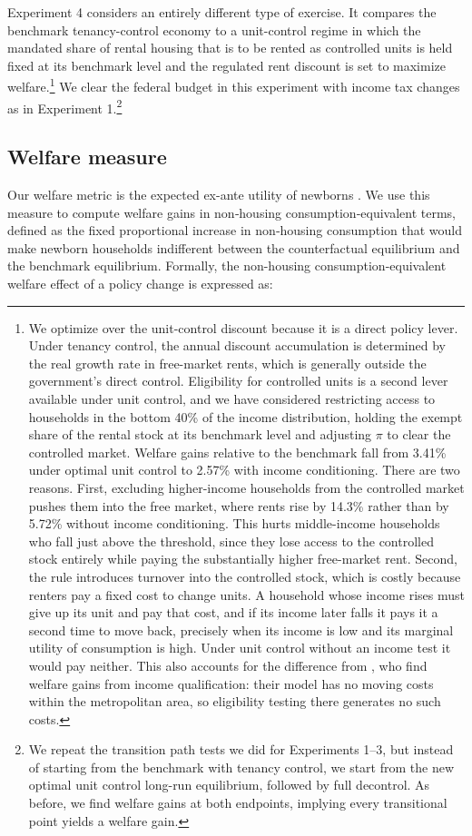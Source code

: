 \documentclass[parskip=full]{article}
\begin{document}
Experiment 4 considers an entirely different type of exercise. It compares the benchmark tenancy-control economy to a unit-control regime in which the mandated share of rental housing that is to be rented as controlled units is held fixed at its benchmark level and the regulated rent discount is set to maximize welfare.\footnote{We optimize over the unit-control discount because it is a direct policy lever. Under tenancy control, the annual discount accumulation is determined by the real growth rate in free-market rents, which is generally outside the government's direct control. Eligibility for controlled units is a second lever available under unit control, and we have considered restricting access to households in the bottom 40\% of the income distribution, holding the exempt share of the rental stock at its benchmark level and adjusting $\pi$ to clear the controlled market. Welfare gains relative to the benchmark fall from 3.41\% under optimal unit control to 2.57\% with income conditioning. There are two reasons. First, excluding higher-income households from the controlled market pushes them into the free market, where rents rise by 14.3\% rather than by 5.72\% without income conditioning. This hurts middle-income households who fall just above the threshold, since they lose access to the controlled stock entirely while paying the substantially higher free-market rent. Second, the rule introduces turnover into the controlled stock, which is costly because renters pay a fixed cost to change units. A household whose income rises must give up its unit and pay that cost, and if its income later falls it pays it a second time to move back, precisely when its income is low and its marginal utility of consumption is high. Under unit control without an income test it would pay neither. This also accounts for the difference from \citet{fmn-2023}, who find welfare gains from income qualification: their model has no moving costs within the metropolitan area, so eligibility testing there generates no such costs.} We clear the federal budget in this experiment with income tax changes as in Experiment 1.\footnote{We repeat the transition path tests we did for Experiments 1--3, but instead of starting from the benchmark with tenancy control, we start from the new optimal unit control long-run equilibrium, followed by full decontrol. As before, we find welfare gains at both endpoints, implying every transitional point yields a welfare gain.}

\subsection{Welfare measure}\label{sec:welfare_measure} Our welfare metric is the expected ex-ante utility of newborns \citep{rawls-1971,conesa-et-al,gkkoc}. We use this measure to compute welfare gains in non‑housing consumption‑equivalent terms, defined as the fixed proportional increase in non‑housing consumption that would make newborn households indifferent between the counterfactual equilibrium and the benchmark equilibrium. Formally, the non-housing consumption-equivalent welfare effect of a policy change is expressed as:
\end{document}
